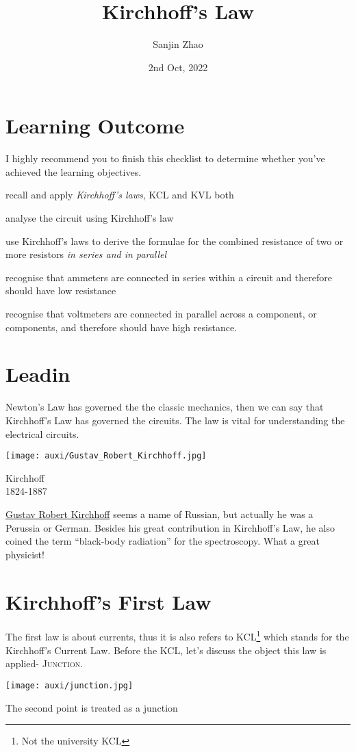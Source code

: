 \documentclass[a4paper]{tufte-handout}
\title{Kirchhoff's Law}
\author{Sanjin Zhao}
\date{2nd Oct, 2022}  %
\begin{document}
\maketitle%
\section*{Learning Outcome}
I highly recommend you to finish this checklist to determine whether you've achieved the learning objectives.
\begin{todolist}
  \item recall and apply \emph{Kirchhoff’s laws}, KCL and KVL both
  \item analyse the circuit using Kirchhoff's law
  \item use Kirchhoff’s laws to derive the formulae for the combined resistance of two or more resistors \emph{in series and in parallel}
  \item recognise that ammeters are connected in series within a circuit and therefore should have low resistance
  \item recognise that voltmeters are connected in parallel across a component, or components, and therefore should have high resistance.
\end{todolist}
\clearpage

\section{Leadin}
Newton's Law has governed the the classic mechanics, then we can say that Kirchhoff's Law has governed the circuits. The law is vital for understanding the electrical circuits.
\begin{marginfigure}
\texttt{[image: auxi/Gustav\_Robert\_Kirchhoff.jpg]}
\caption{Kirchhoff\\1824-1887}
\end{marginfigure}
\href{https://en.wikipedia.org/wiki/Gustav_Kirchhoff}{Gustav Robert Kirchhoff} seems a name of Russian, but actually he was a Perussia or German. Besides his great contribution in Kirchhoff's Law, he also coined the term ``black-body radiation'' for the spectroscopy. What a great physicist!

\section{Kirchhoff's First Law}
The first law is about currents, thus it is also refers to KCL\footnote{Not the university KCL} which stands for the Kirchhoff's Current Law. Before the KCL, let's discuss the object this law is applied- \textcolor{r1}{\textsc{Junction}}.
\begin{marginfigure}
\texttt{[image: auxi/junction.jpg]}
\caption{The second point is treated as a junction}
\end{marginfigure}
\end{document}
